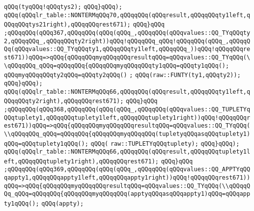 \verb|qQQq(tyqQQq!qQQqtys2);|\newline
\verb|qQQq}qQQq);|\newline
\verb|qQQq(qQQqlr_table::NONTERMqQQq70,qQQqqQQq(qQQqresult,qQQqqQQqty1left,qQQqqQQqtys21right),qQQqqQQqrest671);|\newline
\verb|qQQq}qQQq|\newline
\verb|;qQQqqQQq(qQQq367,qQQqqQQq(qQQq(qQQq_,qQQqqQQq(qQQqvalues::QQ_TYqQQqty2,qQQqqQQq_,qQQqqQQqty2right))qQQq!qQQqqQQq_qQQq!qQQqqQQq(qQQq_,qQQqqQQq(qQQqvalues::QQ_TYqQQqty1,qQQqqQQqty1left,qQQqqQQq_))qQQq!qQQqqQQqrest671))qQQq=>qQQq{qQQqqQQqmyqQQqqQQqresultqQQq=qQQqvalues::QQ_TYqQQq(\\qQQqqQQq_qQQq=qQQqqQQq{qQQqqQQqmyqQQqqQQqty1qQQq=qQQqty1qQQq();|\newline
\verb|qQQqmyqQQqqQQqty2qQQq=qQQqty2qQQq()|\newline
\verb|;|\newline
\verb|qQQq(raw::FUNTY(ty1,qQQqty2));|\newline
\verb|qQQq}qQQq);|\newline
\verb|qQQq(qQQqlr_table::NONTERMqQQq66,qQQqqQQq(qQQqresult,qQQqqQQqty1left,qQQqqQQqty2right),qQQqqQQqrest671);|\newline
\verb|qQQq}qQQq|\newline
\verb|;qQQqqQQq(qQQq368,qQQqqQQq(qQQq(qQQq_,qQQqqQQq(qQQqvalues::QQ_TUPLETYqQQqtuplety1,qQQqqQQqtuplety1left,qQQqqQQqtuplety1right))qQQq!qQQqqQQqrest671))qQQq=>qQQq{qQQqqQQqmyqQQqqQQqresultqQQq=qQQqvalues::QQ_TYqQQq(\\qQQqqQQq_qQQq=qQQqqQQq{qQQqqQQqmyqQQqqQQq(tupletyqQQqasqQQqtuplety1)qQQq=qQQqtuplety1qQQq();|\newline
\verb|qQQq(|\newline
\verb|raw::TUPLETYqQQqtuplety);|\newline
\verb|qQQq}qQQq);|\newline
\verb|qQQq(qQQqlr_table::NONTERMqQQq66,qQQqqQQq(qQQqresult,qQQqqQQqtuplety1left,qQQqqQQqtuplety1right),qQQqqQQqrest671);|\newline
\verb|qQQq}qQQq|\newline
\verb|;qQQqqQQq(qQQq369,qQQqqQQq(qQQq(qQQq_,qQQqqQQq(qQQqvalues::QQ_APPTYqQQqappty1,qQQqqQQqappty1left,qQQqqQQqappty1right))qQQq!qQQqqQQqrest671))qQQq=>qQQq{qQQqqQQqmyqQQqqQQqresultqQQq=qQQqvalues::QQ_TYqQQq(\\qQQqqQQq_qQQq=qQQqqQQq{qQQqqQQqmyqQQqqQQq(apptyqQQqasqQQqappty1)qQQq=qQQqappty1qQQq();|\newline
\verb|qQQq(appty);|\newline
